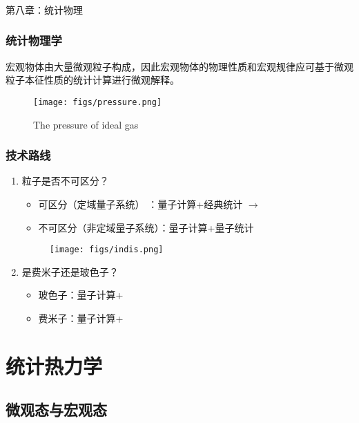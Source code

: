 \begin{frame} [plain]
    \frametitle{}
    \begin{center}
    { {\huge 第八章：统计物理 }}
    \end{center}  
    \addtocounter{framenumber}{-1}   
\end{frame}

\begin{frame}[label=current]
  \frametitle{统计物理学}
  \emf[基本任务：]  宏观物体由大量微观粒子构成，因此宏观物体的物理性质和宏观规律应可基于微观粒子本征性质的统计计算进行微观解释。\\
  \begin{figure}[htbp]
    \centering
    \texttt{[image: figs/pressure.png]}
    \caption{The pressure of ideal gas}
  \end{figure}
\end{frame} 

\begin{frame}
  \frametitle{技术路线}
  \begin{enumerate}
    \item 粒子是否不可区分？
  \begin{itemize}
    \item 可区分（定域量子系统） ：量子计算+经典统计 $\to $\emf[玻尔兹曼统计]  
    \item 不可区分（非定域量子系统）：量子计算+量子统计
  \end{itemize}
  \begin{figure}[htbp]
    \centering
    \texttt{[image: figs/indis.png]}
  \end{figure}
    \item 是费米子还是玻色子？
    \begin{itemize}
      \item 玻色子：量子计算+\emf[玻色-爱因斯坦统计] 
      \item 费米子：量子计算+\emf[费米-狄拉克统计] 
    \end{itemize}
  \end{enumerate} 
\end{frame} 

\section{统计热力学 }

\subsection{微观态与宏观态}

